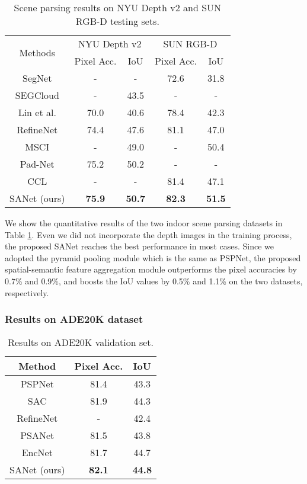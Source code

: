 \documentclass[10pt,twocolumn,twoside]{IEEEtran}
\begin{document}
\begin{table}[h]
\centering
\caption{Scene parsing results on NYU Depth v2 and SUN RGB-D testing sets.}
\label{TB:NYU-SUN}
\begin{tabular}{|c|cc|cc|}
\hline
\multirow{2}{*}{Methods} & \multicolumn{2}{c|}{NYU Depth v2} & \multicolumn{2}{c|}{SUN RGB-D}	 \\
\cline{2-5}  &Pixel Acc. &IoU  &Pixel Acc. &IoU  \\
\hline
SegNet \cite{TPAMI:SEGNET}  &- &-  &72.6 &31.8 \\
SEGCloud \cite{IC3DV17:SEFCLOUD} &- &43.5  &- &-   \\
Lin et al. \cite{CVPR16:PIECEWISE}	&70.0 &40.6  &78.4 &42.3   \\
RefineNet\cite{CVPR17:REFINENET}	&74.4 &47.6  &81.1 &47.0   \\
MSCI \cite{ECCV18:MCCI}		 &- &49.0 &- &50.4 \\
Pad-Net \cite{CVPR18:PAD_NET} &75.2 &50.2 &- &- \\
CCL \cite{CVPR18:CCL} &- &- &81.4 &47.1 \\
\hline
SANet (ours)	&{\bf 75.9} &{\bf 50.7}  &{\bf 82.3} &{\bf 51.5}   \\
\hline
\end{tabular}
\end{table}

We show the quantitative results of the two indoor scene parsing datasets in Table \ref{TB:NYU-SUN}. Even we did not incorporate the depth images in the training process, the proposed SANet reaches the best performance in most cases. Since we adopted the pyramid pooling module which is the same as PSPNet, the proposed spatial-semantic feature aggregation module outperforms the pixel accuracies by 0.7\% and 0.9\%, and boosts the IoU values by 0.5\% and 1.1\% on the two datasets, respectively.



\subsubsection{Results on ADE20K dataset}

\begin{table}[t]
\centering
\caption{Results on ADE20K validation set.}
\label{TB:ADE20K}
\begin{tabular}{|c|cc|}
\hline
{\bf Method}	&Pixel Acc. &IoU  \\
\hline
PSPNet\cite{CVPR17:PSPNET}  &81.4 &43.3 \\
SAC\cite{ICCV17:SAC}  &81.9 &44.3 \\
RefineNet\cite{CVPR17:REFINENET}  &- &42.4  \\
PSANet\cite{ECCV18:PSANET}  &81.5 &43.8 \\
EncNet\cite{CVPR18:ENCNET} & 81.7 & 44.7 \\
\hline
SANet (ours) &{\bf 82.1} &{\bf 44.8}   \\
\hline
\end{tabular}
\end{table}
\end{document}

